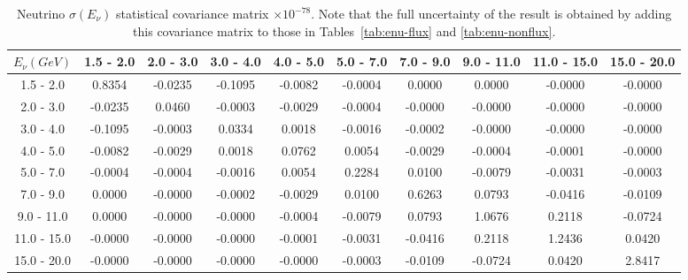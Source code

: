 \documentclass[aps,prl,twocolumn,showpacs,superscriptaddress,nofootinbib]{revtex4}
\begin{document}
\begingroup
\squeezetable
\begin{table}[h]
\tabcolsep=0.11cm
\begin{tabular}{c|ccccccccc}
$E_{\nu}(GeV)$ & 1.5 - 2.0 & 2.0 - 3.0 & 3.0 - 4.0 & 4.0 - 5.0 & 5.0 - 7.0 & 7.0 - 9.0 & 9.0 - 11.0 & 11.0 - 15.0 & 15.0 - 20.0\\
\hline
1.5 - 2.0&0.8354	&-0.0235	&-0.1095	&-0.0082	&-0.0004	&0.0000	&0.0000	&-0.0000	&-0.0000\\	
2.0 - 3.0&-0.0235	&0.0460	&-0.0003	&-0.0029	&-0.0004	&-0.0000&	-0.0000	&-0.0000	&-0.0000	\\
3.0 - 4.0&-0.1095	&-0.0003	&0.0334	&0.0018	&-0.0016	&-0.0002	&-0.0000	&-0.0000	&-0.0000	\\
4.0 - 5.0&-0.0082	&-0.0029	&0.0018	&0.0762	&0.0054&	-0.0029	&-0.0004	&-0.0001	&-0.0000	\\
 5.0 - 7.0&-0.0004	&-0.0004	&-0.0016	&0.0054	&0.2284&	0.0100	&-0.0079	&-0.0031	&-0.0003	\\
7.0 - 9.0&0.0000	&-0.0000	&-0.0002	&-0.0029	&0.0100&	0.6263	&0.0793	&-0.0416	&-0.0109	\\
9.0 - 11.0&0.0000	&-0.0000&	-0.0000	&-0.0004	&-0.0079	&0.0793	&1.0676	&0.2118	&-0.0724	\\
11.0 - 15.0 &-0.0000	&-0.0000	&-0.0000	&-0.0001	&-0.0031	&-0.0416	&0.2118	&1.2436	&0.0420	\\
15.0 - 20.0&-0.0000	&-0.0000	&-0.0000	&-0.0000	&-0.0003	&-0.0109	&-0.0724	&0.0420&	2.8417	\\

\end{tabular}
\caption{Neutrino $\sigma(E_\nu)$ statistical covariance matrix  $\times 10^{-78}$.  Note that the full uncertainty of the result is obtained by adding this covariance matrix to those in Tables~\ref{tab:enu-flux} and \ref{tab:enu-nonflux}. }
\end{table}
\endgroup
\end{document}
